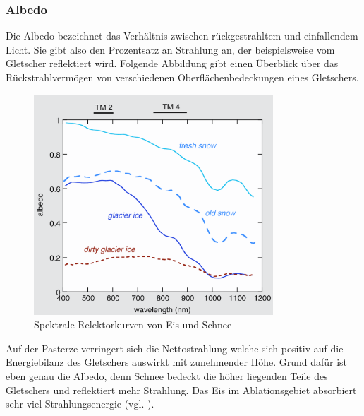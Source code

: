 \documentclass[12pt,a4paper]{article}
\begin{document}
\subsubsection{Albedo}\label{Albedo}
Die Albedo bezeichnet das Verhältnis zwischen rückgestrahltem und einfallendem Licht. Sie gibt also den Prozentsatz an Strahlung an, der beispielsweise vom Gletscher reflektiert wird. Folgende Abbildung gibt einen Überblick über das Rückstrahlvermögen von verschiedenen Oberflächenbedeckungen eines Gletschers.

\begin{figure}[H]
\centering
\includegraphics[width=0.8\textwidth]{pictures/spectral_reflectance_curves_for_ice_and_snow.png}
\caption{Spektrale Relektorkurven von Eis und Schnee \parencite{Themicroclimateofvalleyglaciers}}
\label{fig:Spektrale Relektorkurven von Eis und Schnee}
\end{figure}

Auf der Pasterze verringert sich die Nettostrahlung welche sich positiv auf die Energiebilanz des Gletschers auswirkt mit zunehmender Höhe. Grund dafür ist eben genau die Albedo, denn Schnee bedeckt die höher liegenden Teile des Gletschers und reflektiert mehr Strahlung. Das Eis im Ablationsgebiet absorbiert sehr viel Strahlungsenergie (vgl. \cite[171]{ThePhysicsOfGlaciers}).
\end{document}
